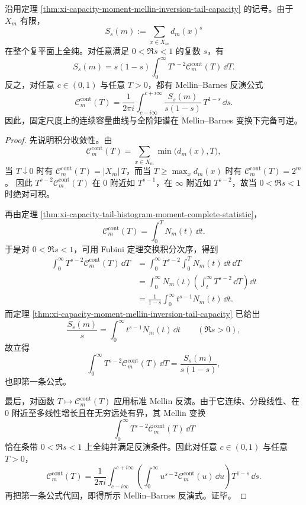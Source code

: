 \begin{theorem}\label{thm:xi-capacity-moment-mellin-barnes-complete-inversion}
沿用定理 \ref{thm:xi-capacity-moment-mellin-inversion-tail-capacity} 的记号。由于 \(X_m\) 有限，
\[
S_s(m):=\sum_{x\in X_m}d_m(x)^s
\]
在整个复平面上全纯。对任意满足 \(0<\Re s<1\) 的复数 \(s\)，有
\[
\boxed{\;
S_s(m)
=
s(1-s)\int_0^\infty T^{s-2}\mathcal C_m^{\mathrm{cont}}(T)\,\dd T.\;}
\]
反之，对任意 \(c\in(0,1)\) 与任意 \(T>0\)，都有 Mellin--Barnes 反演公式
\[
\boxed{\;
\mathcal C_m^{\mathrm{cont}}(T)
=
\frac{1}{2\pi i}
\int_{c-i\infty}^{c+i\infty}
\frac{S_s(m)}{s(1-s)}\,T^{1-s}\,\dd s.\;}
\]
因此，固定尺度上的连续容量曲线与全阶矩谱在 Mellin--Barnes 变换下完备可逆。
\end{theorem}
\begin{proof}
先说明积分收敛性。由
\[
\mathcal C_m^{\mathrm{cont}}(T)=\sum_{x\in X_m}\min\bigl(d_m(x),T\bigr),
\]
当 \(T\downarrow 0\) 时有
\(
\mathcal C_m^{\mathrm{cont}}(T)=|X_m|\,T
\)，而当 \(T\ge \max_x d_m(x)\) 时有
\(
\mathcal C_m^{\mathrm{cont}}(T)=2^m
\)。
因此
\(
T^{s-2}\mathcal C_m^{\mathrm{cont}}(T)
\)
在 \(0\) 附近如 \(T^{s-1}\)，在 \(\infty\) 附近如 \(T^{s-2}\)，故当 \(0<\Re s<1\) 时绝对可积。

再由定理 \ref{thm:xi-capacity-tail-histogram-moment-complete-statistic}，
\[
\mathcal C_m^{\mathrm{cont}}(T)=\int_0^T N_m(t)\,\dd t.
\]
于是对 \(0<\Re s<1\)，可用 Fubini 定理交换积分次序，得到
\[
\begin{aligned}
\int_0^\infty T^{s-2}\mathcal C_m^{\mathrm{cont}}(T)\,\dd T
&=
\int_0^\infty T^{s-2}\int_0^T N_m(t)\,\dd t\,\dd T\\
&=
\int_0^\infty N_m(t)\left(\int_t^\infty T^{s-2}\,\dd T\right)\dd t\\
&=
\frac{1}{1-s}\int_0^\infty t^{s-1}N_m(t)\,\dd t.
\end{aligned}
\]
而定理 \ref{thm:xi-capacity-moment-mellin-inversion-tail-capacity} 已给出
\[
\frac{S_s(m)}{s}
=
\int_0^\infty t^{s-1}N_m(t)\,\dd t
\qquad(\Re s>0),
\]
故立得
\[
\int_0^\infty T^{s-2}\mathcal C_m^{\mathrm{cont}}(T)\,\dd T
=
\frac{S_s(m)}{s(1-s)},
\]
也即第一条公式。

最后，对函数
\(
T\mapsto \mathcal C_m^{\mathrm{cont}}(T)
\)
应用标准 Mellin 反演。由于它连续、分段线性、在 \(0\) 附近至多线性增长且在无穷远处有界，其 Mellin 变换
\[
\int_0^\infty T^{s-2}\mathcal C_m^{\mathrm{cont}}(T)\,\dd T
\]
恰在条带 \(0<\Re s<1\) 上全纯并满足反演条件。因此对任意 \(c\in(0,1)\) 与任意 \(T>0\)，
\[
\mathcal C_m^{\mathrm{cont}}(T)
=
\frac{1}{2\pi i}
\int_{c-i\infty}^{c+i\infty}
\left(\int_0^\infty u^{s-2}\mathcal C_m^{\mathrm{cont}}(u)\,\dd u\right)
T^{1-s}\,\dd s.
\]
再把第一条公式代回，即得所示 Mellin--Barnes 反演式。证毕。
\end{proof}

